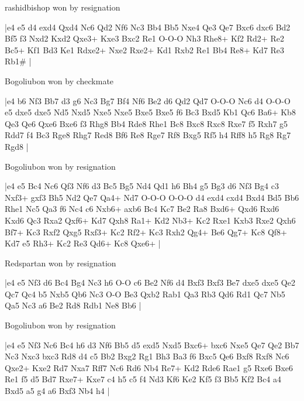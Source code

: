 \showboard

rashidbishop won by resignation

\makegametitle
|e4 e5 d4 exd4 Qxd4 Nc6 Qd2 Nf6 Nc3 Bb4 Bb5 Nxe4 Qe3 Qe7 Bxc6 dxc6 Bd2 Bf5 f3 Nxd2 Kxd2 Qxe3+ Kxe3 Bxc2 Re1 O-O-O Nh3 Rhe8+ Kf2 Rd2+ Re2 Bc5+ Kf1 Bd3 Ke1 Rdxe2+ Nxe2 Rxe2+ Kd1 Rxb2 Re1 Bb4 Re8+ Kd7 Re3 Rb1\#  |

\showboard

Bogoliubon won by checkmate

\makegametitle
|e4 b6 Nf3 Bb7 d3 g6 Nc3 Bg7 Bf4 Nf6 Be2 d6 Qd2 Qd7 O-O-O Nc6 d4 O-O-O e5 dxe5 dxe5 Nd5 Nxd5 Nxe5 Nxe5 Bxe5 Bxe5 f6 Bc3 Bxd5 Kb1 Qc6 Ba6+ Kb8 Qe3 Qe6 Qxe6 Bxe6 f3 Rhg8 Bb4 Rde8 Rhe1 Bc8 Bxc8 Rxc8 Rxe7 f5 Rxh7 g5 Rdd7 f4 Bc3 Rge8 Rhg7 Red8 Bf6 Re8 Rge7 Rf8 Bxg5 Rf5 h4 Rff8 h5 Rg8 Rg7 Rgd8  |

\showboard

Bogoliubon won by resignation

\makegametitle
|e4 e5 Bc4 Nc6 Qf3 Nf6 d3 Bc5 Bg5 Nd4 Qd1 h6 Bh4 g5 Bg3 d6 Nf3 Bg4 c3 Nxf3+ gxf3 Bh5 Nd2 Qe7 Qa4+ Nd7 O-O-O O-O-O d4 exd4 cxd4 Bxd4 Bd5 Bb6 Rhe1 Nc5 Qa3 f6 Nc4 c6 Nxb6+ axb6 Bc4 Kc7 Be2 Ra8 Bxd6+ Qxd6 Rxd6 Kxd6 Qc3 Rxa2 Qxf6+ Kd7 Qxh8 Ra1+ Kd2 Nb3+ Kc2 Rxe1 Kxb3 Rxe2 Qxh6 Bf7+ Kc3 Rxf2 Qxg5 Rxf3+ Kc2 Rf2+ Kc3 Rxh2 Qg4+ Be6 Qg7+ Kc8 Qf8+ Kd7 e5 Rh3+ Kc2 Re3 Qd6+ Kc8 Qxe6+  |

\showboard

Redspartan won by resignation

\makegametitle
|e4 e5 Nf3 d6 Bc4 Bg4 Nc3 h6 O-O c6 Be2 Nf6 d4 Bxf3 Bxf3 Be7 dxe5 dxe5 Qe2 Qc7 Qc4 b5 Nxb5 Qb6 Nc3 O-O Be3 Qxb2 Rab1 Qa3 Rb3 Qd6 Rd1 Qc7 Nb5 Qa5 Nc3 a6 Be2 Rd8 Rdb1 Ne8 Bb6  |

\showboard

Bogoliubon won by resignation

\makegametitle
|e4 e5 Nf3 Nc6 Bc4 h6 d3 Nf6 Bb5 d5 exd5 Nxd5 Bxc6+ bxc6 Nxe5 Qe7 Qe2 Bb7 Nc3 Nxc3 bxc3 Rd8 d4 c5 Bb2 Bxg2 Rg1 Bh3 Ba3 f6 Bxc5 Qe6 Bxf8 Rxf8 Nc6 Qxe2+ Kxe2 Rd7 Nxa7 Rff7 Nc6 Rd6 Nb4 Re7+ Kd2 Rde6 Rae1 g5 Rxe6 Bxe6 Re1 f5 d5 Bd7 Rxe7+ Kxe7 c4 h5 c5 f4 Nd3 Kf6 Ke2 Kf5 f3 Bb5 Kf2 Bc4 a4 Bxd5 a5 g4 a6 Bxf3 Nb4 h4  |

